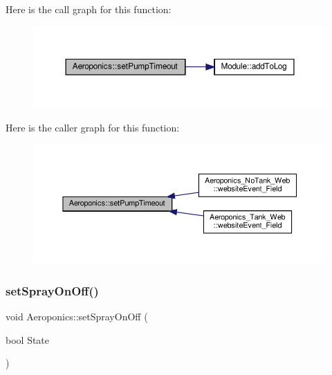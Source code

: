 Here is the call graph for this function\+:
\nopagebreak
\begin{figure}[H]
\begin{center}
\leavevmode
\includegraphics[width=350pt]{class_aeroponics_ac0363ff5470e85f5acda1842a616dd41_cgraph}
\end{center}
\end{figure}
Here is the caller graph for this function\+:
\nopagebreak
\begin{figure}[H]
\begin{center}
\leavevmode
\includegraphics[width=350pt]{class_aeroponics_ac0363ff5470e85f5acda1842a616dd41_icgraph}
\end{center}
\end{figure}
\mbox{\label{class_aeroponics_a459d83fc32d3369938be2953138c9b96}} 
\subsubsection{\texorpdfstring{set\+Spray\+On\+Off()}{setSprayOnOff()}\hspace{0.1cm}{\footnotesize\ttfamily [1/2]}}
{\footnotesize\ttfamily void Aeroponics\+::set\+Spray\+On\+Off (\begin{DoxyParamCaption}\item[{bool}]{State }\end{DoxyParamCaption})\hspace{0.3cm}{\ttfamily [protected]}}

